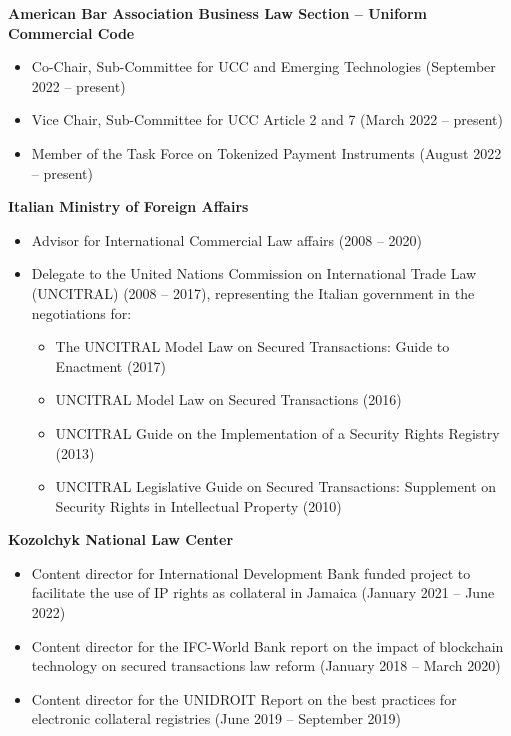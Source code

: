 \documentclass[
  11pt,
  letterpaper]{article}
\begin{document}
\noindent\textbf{American Bar Association Business Law Section -- Uniform Commercial Code}

\begin{itemize}
\item Co-Chair, Sub-Committee for UCC and Emerging Technologies (September 2022 -- present)
\item Vice Chair, Sub-Committee for UCC Article 2 and 7 (March 2022 -- present)
\item Member of the Task Force on Tokenized Payment Instruments (August 2022 -- present)
\end{itemize}

\noindent\textbf{Italian Ministry of Foreign Affairs}

\begin{itemize}
\item Advisor for International Commercial Law affairs (2008 -- 2020)
\item Delegate to the United Nations Commission on International Trade Law (UNCITRAL) (2008 -- 2017), representing the Italian government in the negotiations for:
  \begin{itemize}
  \item The UNCITRAL Model Law on Secured Transactions: Guide to Enactment (2017)
  \item UNCITRAL Model Law on Secured Transactions (2016)
  \item UNCITRAL Guide on the Implementation of a Security Rights Registry (2013)
  \item UNCITRAL Legislative Guide on Secured Transactions: Supplement on Security Rights in Intellectual Property (2010)
  \end{itemize}
\end{itemize}

\noindent\textbf{Kozolchyk National Law Center}

\begin{itemize}
\item Content director for International Development Bank funded project to facilitate the use of IP rights as collateral in Jamaica (January 2021 -- June 2022)
\item Content director for the IFC-World Bank report on the impact of blockchain technology on secured transactions law reform (January 2018 -- March 2020)
\item Content director for the UNIDROIT Report on the best practices for electronic collateral registries (June 2019 -- September 2019)
\end{itemize}
\end{document}

